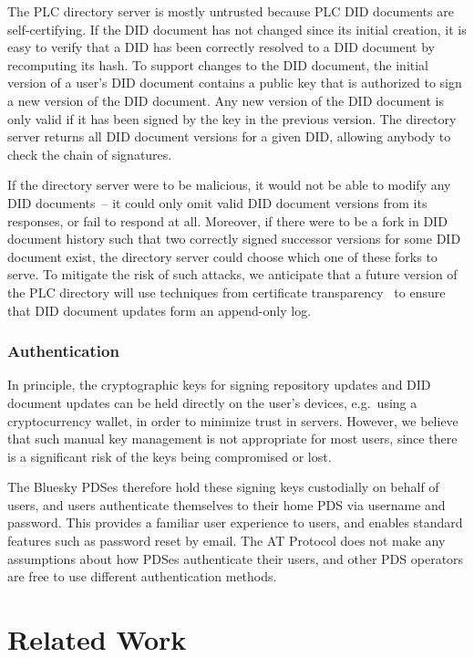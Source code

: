 \documentclass[sigconf,nonacm]{acmart}
\begin{document}
The PLC directory server is mostly untrusted because PLC DID documents are self-certifying.
If the DID document has not changed since its initial creation, it is easy to verify that a DID has been correctly resolved to a DID document by recomputing its hash.
To support changes to the DID document, the initial version of a user's DID document contains a public key that is authorized to sign a new version of the DID document.
Any new version of the DID document is only valid if it has been signed by the key in the previous version.
The directory server returns all DID document versions for a given DID, allowing anybody to check the chain of signatures.

If the directory server were to be malicious, it would not be able to modify any DID documents~-- it could only omit valid DID document versions from its responses, or fail to respond at all.
Moreover, if there were to be a fork in DID document history such that two correctly signed successor versions for some DID document exist, the directory server could choose which one of these forks to serve.
To mitigate the risk of such attacks, we anticipate that a future version of the PLC directory will use techniques from certificate transparency~\cite{Laurie:2014} to ensure that DID document updates form an append-only log.

\subsubsection{Authentication}

In principle, the cryptographic keys for signing repository updates and DID document updates can be held directly on the user's devices, e.g.\ using a cryptocurrency wallet, in order to minimize trust in servers.
However, we believe that such manual key management is not appropriate for most users, since there is a significant risk of the keys being compromised or lost.

The Bluesky PDSes therefore hold these signing keys custodially on behalf of users, and users authenticate themselves to their home PDS via username and password.
This provides a familiar user experience to users, and enables standard features such as password reset by email.
The AT Protocol does not make any assumptions about how PDSes authenticate their users, and other PDS operators are free to use different authentication methods.

\section{Related Work}\label{sec:related-work}
\end{document}
